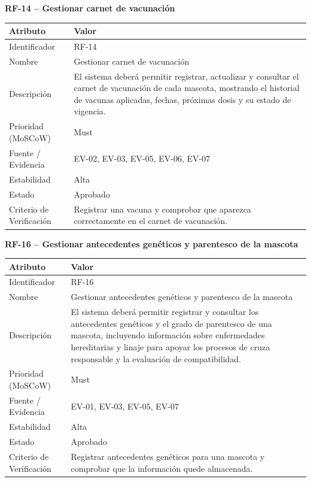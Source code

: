 \documentclass[journal,onecolumn]{IEEEtran}
\begin{document}
	\textbf{RF-14 -- Gestionar carnet de vacunación}
	\begin{table}[H]
		\centering\small
		\begin{tabularx}{\linewidth}{|l|X|}
			\hline
			\textbf{Atributo} & \textbf{Valor} \\ \hline
			Identificador & RF-14 \\ \hline
			Nombre & Gestionar carnet de vacunación \\ \hline
			Descripción & El sistema deberá permitir registrar, actualizar y consultar el carnet de vacunación de cada mascota, mostrando el historial de vacunas aplicadas, fechas, próximas dosis y su estado de vigencia. \\ \hline
			Prioridad (MoSCoW) & Must \\ \hline
			Fuente / Evidencia & EV-02, EV-03, EV-05, EV-06, EV-07 \\ \hline
			Estabilidad & Alta \\ \hline
			Estado & Aprobado \\ \hline
			Criterio de Verificación & Registrar una vacuna y comprobar que aparezca correctamente en el carnet de vacunación. \\ \hline
		\end{tabularx}
	\end{table}
	
	\textbf{RF-16 -- Gestionar antecedentes genéticos y parentesco de la mascota}
	\begin{table}[H]
		\centering\small
		\begin{tabularx}{\linewidth}{|l|X|}
			\hline
			\textbf{Atributo} & \textbf{Valor} \\ \hline
			Identificador & RF-16 \\ \hline
			Nombre & Gestionar antecedentes genéticos y parentesco de la mascota \\ \hline
			Descripción & El sistema deberá permitir registrar y consultar los antecedentes genéticos y el grado de parentesco de una mascota, incluyendo información sobre enfermedades hereditarias y linaje para apoyar los procesos de cruza responsable y la evaluación de compatibilidad. \\ \hline
			Prioridad (MoSCoW) & Must \\ \hline
			Fuente / Evidencia & EV-01, EV-03, EV-05, EV-07 \\ \hline
			Estabilidad & Alta \\ \hline
			Estado & Aprobado \\ \hline
			Criterio de Verificación & Registrar antecedentes genéticos para una mascota y comprobar que la información quede almacenada. \\ \hline
		\end{tabularx}
	\end{table}
	
\end{document}

